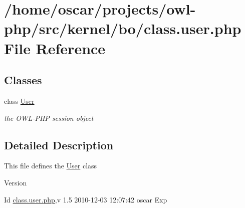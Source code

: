 \section{/home/oscar/projects/owl-\/php/src/kernel/bo/class.user.php File Reference}
\label{class_8user_8php}
\subsection*{Classes}
\begin{DoxyCompactItemize}
\item 
class \hyperlink{classUser}{User}
\begin{DoxyCompactList}\small\item\em the OWL-\/PHP session object \item\end{DoxyCompactList}\end{DoxyCompactItemize}


\subsection{Detailed Description}
This file defines the \hyperlink{classUser}{User} class \begin{DoxyVersion}{Version}

\end{DoxyVersion}
\begin{DoxyParagraph}{Id}
\hyperlink{class_8user_8php}{class.user.php},v 1.5 2010-\/12-\/03 12:07:42 oscar Exp 
\end{DoxyParagraph}
